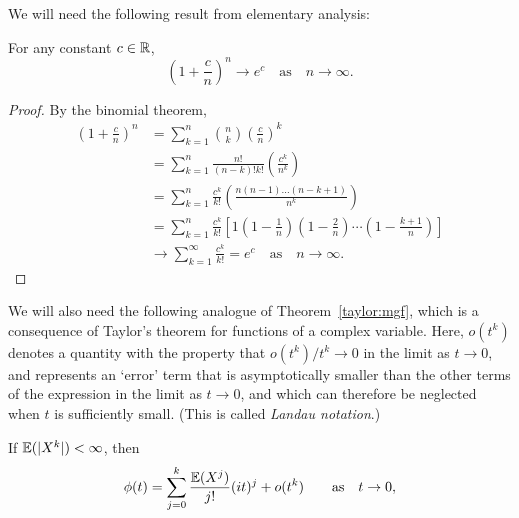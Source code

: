 We will need the following result from elementary analysis:
\begin{lemma}\label{lem:standard_identity}
For any constant $c\in\mathbb{R}$,
\[
\left(1+\frac{c}{n}\right)^n\to e^c \quad\text{as}\quad n\to\infty.
\]
\end{lemma}
\begin{proof}
By the binomial theorem,
\begin{align*}
\left(1+\frac{c}{n}\right)^n
	& = \sum_{k=1}^n \binom{n}{k}\left(\frac{c}{n}\right)^k \\
	& = \sum_{k=1}^n \frac{n!}{(n-k)!k!}\left(\frac{c^k}{n^k}\right) \\
	& = \sum_{k=1}^n \frac{c^k}{k!}\left(\frac{n(n-1)\ldots(n-k+1)}{n^k}\right) \\
	& = \sum_{k=1}^n \frac{c^k}{k!}\left[1\left(1-\frac{1}{n}\right)\left(1-\frac{2}{n}\right)\cdots\left(1-\frac{k+1}{n}\right)\right] \\
	& \to \sum_{k=1}^{\infty} \frac{c^k}{k!} = e^c \quad\text{as}\quad n\to\infty.
\end{align*}

\end{proof}


\bigskip
We will also need the following analogue of Theorem~\ref{taylor:mgf}, which is a consequence of Taylor's theorem for functions of a complex variable. Here, $o(t^k)$ denotes a quantity with the property that $o(t^k)/t^k\to 0$ in the limit as $t\to 0$, and represents an `error' term that is asymptotically smaller than the other terms of the expression in the limit as $t\to 0$, and which can therefore be neglected when $t$ is sufficiently small. (This is called \emph{Landau notation}.)
\begin{theorem}\label{thm:taylor-complex}
If $\mathbb{E}(|X^k|)<\infty$, then
\[
\phi(t) = \sum_{j=0}^k \frac{\mathbb{E}(X^j)}{j!}(it)^j + o(t^k) \qquad\text{as}\quad t\to 0,
\]
\end{theorem}
\proofomitted


